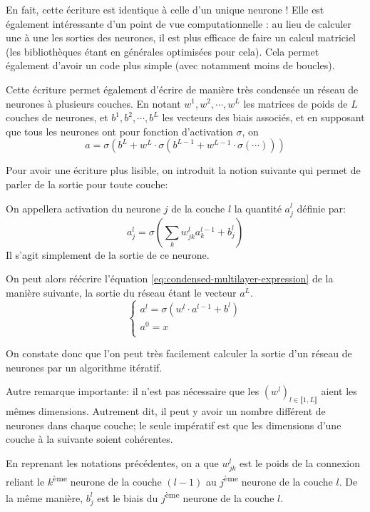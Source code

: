 En fait, cette écriture est identique à celle d'un unique neurone !
Elle est également intéressante d'un point de vue computationnelle : au lieu 
de calculer une à une les sorties des neurones, il est plus efficace de faire 
un calcul matriciel (les bibliothèques étant en générales optimisées pour cela).
Cela permet également d'avoir un code plus simple (avec notamment moins de boucles).

Cette écriture permet également d'écrire de manière très condensée un réseau 
de neurones à plusieurs couches. 
En notant $w^{1}, w^{2}, \cdots, w^{L}$ les matrices de poids de $L$ couches de 
neurones, et $b^{1}, b^{2}, \cdots, b^{L}$ les vecteurs des biais associés, et 
en supposant que tous les neurones ont pour fonction d'activation $\sigma$, on 
\begin{equation}
\label{eq:condensed-multilayer-expression}
a = \sigma(b^{L} + w^{L} \cdot \sigma(b^{L-1} + w^{L-1} \cdot \sigma(\cdots)))
\end{equation}

Pour avoir une écriture plus lisible, on introduit la notion suivante qui 
permet de parler de la sortie pour toute couche:
\begin{definition}
On appellera activation du neurone $j$ de la couche $l$ la quantité $a_{j}^{l}$ 
définie par:
\[
a_{j}^{l} = \sigma \left( \sum_{k} w_{jk}^{l} a_{k}^{l-1} + b_{j}^{l} \right)
\]
Il s'agit simplement de la sortie de ce neurone.
\end{definition}

On peut alors réécrire l'équation \ref{eq:condensed-multilayer-expression} de la 
manière suivante, la sortie du réseau étant le vecteur $a^{L}$.
\[
\begin{cases}
 a^{l} = \sigma(w^{l} \cdot a^{l-1} + b^{l}) \\
 a^{0} = x \\
\end{cases}
\]

On constate donc que l'on peut très facilement calculer la sortie d'un réseau 
de neurones par un algorithme itératif. 

Autre remarque importante: il n'est pas nécessaire que les $(w^{l})_{l \in \llbracket 1, L \rrbracket}$ 
aient les mêmes dimensions. Autrement dit, il peut y avoir un nombre différent 
de neurones dans chaque couche; le seule impératif est que les dimensions 
d'une couche à la suivante soient cohérentes.

En reprenant les notations précédentes, on a que $w_{jk}^{l}$ est le poids de la 
connexion reliant le $k$\textsuperscript{ème} neurone de la couche $(l-1)$ au 
$j$\textsuperscript{ème} neurone de la couche $l$.
De la même manière, $b_{j}^{l}$ est le biais du $j$\textsuperscript{ème} neurone 
de la couche $l$.



